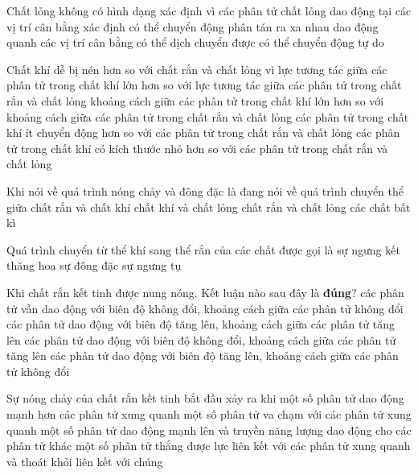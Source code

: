 \begin{ex}
	Chất lỏng không có hình dạng xác định vì các phân tử chất lỏng
	\choice
	{dao động tại các vị trí cân bằng xác định}
	{có thể chuyển động phân tán ra xa nhau}
	{\True dao động quanh các vị trí cân bằng có thể dịch chuyển được}
	{có thể chuyển động tự do}
	\loigiai{}
\end{ex}
\begin{ex}
Chất khí dễ bị nén hơn so với chất rắn và chất lỏng vì	
	\choice
	{lực tương tác giữa các phân tử trong chất khí lớn hơn so với lực tương tác giữa các phân tử trong chất rắn và chất lỏng}
	{\True khoảng cách giữa các phân tử trong chất khí lớn hơn so với khoảng cách giữa các phân tử trong chất rắn và chất lỏng}
	{các phân tử trong chất khí ít chuyển động hơn so với các phân tử trong chất rắn và chất lỏng}
	{các phân tử trong chất khí có kích thước nhỏ hơn so với các phân tử trong chất rắn và chất lỏng}
	\loigiai{}
\end{ex}
\begin{ex}
Khi nói về quá trình nóng chảy và đông đặc là đang nói về quá trình chuyển thể giữa	
	\choice
	{chất rắn và chất khí}
	{chất khí và chất lỏng}
	{\True chất rắn và chất lỏng}
	{các chất bất kì}
	\loigiai{}
\end{ex}
\begin{ex}
	Quá trình chuyển từ thể khí sang thể rắn của các chất được gọi là
	\choice
	{\True sự ngưng kết}
	{thăng hoa}
	{sự đông đặc}
	{sự ngưng tụ}
	\loigiai{}
\end{ex}
\begin{ex}
	Khi chất rắn kết tinh được nung nóng. Kết luận nào sau đây là \textbf{đúng}?
	\choice
	{các phân tử vẫn dao động với biên độ không đổi, khoảng cách giữa các phân tử không đổi}
	{\True các phân tử dao động với biên độ tăng lên, khoảng cách giữa các phân tử tăng lên}
	{các phân tử dao động với biên độ không đổi, khoảng cách giữa các phân tử tăng lên}
	{các phân tử dao động với biên độ tăng lên, khoảng cách giữa các phân tử không đổi}
	\loigiai{}
\end{ex}
\begin{ex}
	Sự nóng chảy của chất rắn kết tinh bắt đầu xảy ra khi
	\choice
	{một số phân tử dao động mạnh hơn các phân tử xung quanh}
	{một số phân tử va chạm với các phân tử xung quanh}
	{một số phân tử dao động mạnh lên và truyền năng lượng dao động cho các phân tử khác}
	{\True một số phân tử thắng được lực liên kết với các phân tử xung quanh và thoát khỏi liên kết với chúng}
	\loigiai{}
\end{ex}
